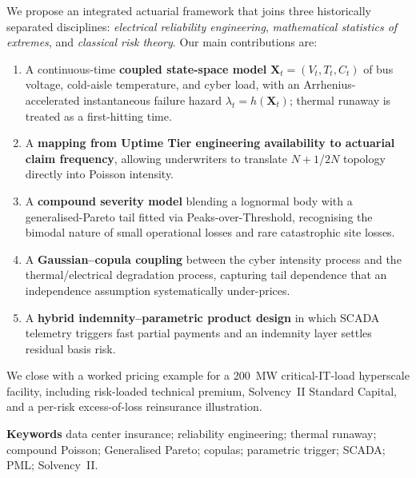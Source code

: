 \documentclass[11pt,a4paper]{article}
\theoremstyle{ia}
\newcommand{\1}{\mathbf{1}}
\begin{document}
We propose an integrated actuarial framework that joins three
historically separated disciplines: \emph{electrical reliability
engineering}, \emph{mathematical statistics of extremes}, and
\emph{classical risk theory}. Our main contributions are:
\begin{enumerate}[leftmargin=*,nosep,topsep=4pt]
  \item A continuous-time \textbf{coupled state-space model}
        $\mathbf{X}_t=(V_t,T_t,C_t)$ of bus voltage, cold-aisle
        temperature, and cyber load, with an Arrhenius-accelerated
        instantaneous failure hazard $\lambda_t = h(\mathbf{X}_t)$;
        thermal runaway is treated as a first-hitting time.
  \item A \textbf{mapping from Uptime Tier engineering
        availability to actuarial claim frequency}, allowing
        underwriters to translate $N+1$/$2N$ topology directly into
        Poisson intensity.
  \item A \textbf{compound severity model} blending a lognormal
        body with a generalised-Pareto tail fitted via Peaks-over-Threshold,
        recognising the bimodal nature of small operational losses
        and rare catastrophic site losses.
  \item A \textbf{Gaussian--copula coupling} between the cyber
        intensity process and the thermal/electrical degradation
        process, capturing tail dependence that an independence
        assumption systematically under-prices.
  \item A \textbf{hybrid indemnity--parametric product design}
        in which SCADA telemetry triggers fast partial payments and
        an indemnity layer settles residual basis risk.
\end{enumerate}
We close with a worked pricing example for a \SI{200}{\mega\watt}
critical-IT-load hyperscale facility, including risk-loaded
technical premium, Solvency~II Standard Capital, and a
per-risk excess-of-loss reinsurance illustration.

\par\vspace{4pt}\noindent{\color{iarule}\rule{\textwidth}{0.3pt}}\par\vspace{6pt}

\noindent
{\sffamily\footnotesize\color{iadark}\textbf{Keywords}}\quad
{\footnotesize data center insurance; reliability engineering;
thermal runaway; compound Poisson; Generalised Pareto; copulas;
parametric trigger; SCADA; PML; Solvency~II.}
\end{document}
